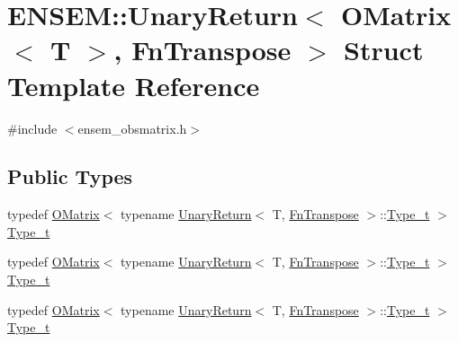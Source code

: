 \hypertarget{structENSEM_1_1UnaryReturn_3_01OMatrix_3_01T_01_4_00_01FnTranspose_01_4}{}\section{E\+N\+S\+EM\+:\+:Unary\+Return$<$ O\+Matrix$<$ T $>$, Fn\+Transpose $>$ Struct Template Reference}
\label{structENSEM_1_1UnaryReturn_3_01OMatrix_3_01T_01_4_00_01FnTranspose_01_4}


{\ttfamily \#include $<$ensem\+\_\+obsmatrix.\+h$>$}

\subsection*{Public Types}
\begin{DoxyCompactItemize}
\item 
typedef \mbox{\hyperlink{classENSEM_1_1OMatrix}{O\+Matrix}}$<$ typename \mbox{\hyperlink{structENSEM_1_1UnaryReturn}{Unary\+Return}}$<$ T, \mbox{\hyperlink{structENSEM_1_1FnTranspose}{Fn\+Transpose}} $>$\+::\mbox{\hyperlink{structENSEM_1_1UnaryReturn_3_01OMatrix_3_01T_01_4_00_01FnTranspose_01_4_a5baf7be8d88ac60f5375088eb7463444}{Type\+\_\+t}} $>$ \mbox{\hyperlink{structENSEM_1_1UnaryReturn_3_01OMatrix_3_01T_01_4_00_01FnTranspose_01_4_a5baf7be8d88ac60f5375088eb7463444}{Type\+\_\+t}}
\item 
typedef \mbox{\hyperlink{classENSEM_1_1OMatrix}{O\+Matrix}}$<$ typename \mbox{\hyperlink{structENSEM_1_1UnaryReturn}{Unary\+Return}}$<$ T, \mbox{\hyperlink{structENSEM_1_1FnTranspose}{Fn\+Transpose}} $>$\+::\mbox{\hyperlink{structENSEM_1_1UnaryReturn_3_01OMatrix_3_01T_01_4_00_01FnTranspose_01_4_a5baf7be8d88ac60f5375088eb7463444}{Type\+\_\+t}} $>$ \mbox{\hyperlink{structENSEM_1_1UnaryReturn_3_01OMatrix_3_01T_01_4_00_01FnTranspose_01_4_a5baf7be8d88ac60f5375088eb7463444}{Type\+\_\+t}}
\item 
typedef \mbox{\hyperlink{classENSEM_1_1OMatrix}{O\+Matrix}}$<$ typename \mbox{\hyperlink{structENSEM_1_1UnaryReturn}{Unary\+Return}}$<$ T, \mbox{\hyperlink{structENSEM_1_1FnTranspose}{Fn\+Transpose}} $>$\+::\mbox{\hyperlink{structENSEM_1_1UnaryReturn_3_01OMatrix_3_01T_01_4_00_01FnTranspose_01_4_a5baf7be8d88ac60f5375088eb7463444}{Type\+\_\+t}} $>$ \mbox{\hyperlink{structENSEM_1_1UnaryReturn_3_01OMatrix_3_01T_01_4_00_01FnTranspose_01_4_a5baf7be8d88ac60f5375088eb7463444}{Type\+\_\+t}}
\end{DoxyCompactItemize}


